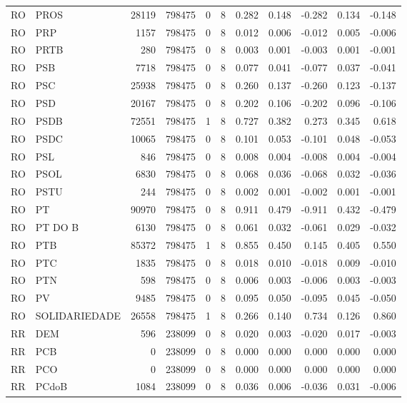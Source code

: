 \begin{landscape}
\begin{longtable}{llrrrrrrrrr}
RO & PROS & 28119 & 798475 & 0 & 8 & 0.282 & 0.148 & -0.282 & 0.134 & -0.148 \\
RO & PRP & 1157 & 798475 & 0 & 8 & 0.012 & 0.006 & -0.012 & 0.005 & -0.006 \\
RO & PRTB & 280 & 798475 & 0 & 8 & 0.003 & 0.001 & -0.003 & 0.001 & -0.001 \\
RO & PSB & 7718 & 798475 & 0 & 8 & 0.077 & 0.041 & -0.077 & 0.037 & -0.041 \\
RO & PSC & 25938 & 798475 & 0 & 8 & 0.260 & 0.137 & -0.260 & 0.123 & -0.137 \\
RO & PSD & 20167 & 798475 & 0 & 8 & 0.202 & 0.106 & -0.202 & 0.096 & -0.106 \\
RO & PSDB & 72551 & 798475 & 1 & 8 & 0.727 & 0.382 & 0.273 & 0.345 & 0.618 \\
RO & PSDC & 10065 & 798475 & 0 & 8 & 0.101 & 0.053 & -0.101 & 0.048 & -0.053 \\
RO & PSL & 846 & 798475 & 0 & 8 & 0.008 & 0.004 & -0.008 & 0.004 & -0.004 \\
RO & PSOL & 6830 & 798475 & 0 & 8 & 0.068 & 0.036 & -0.068 & 0.032 & -0.036 \\
RO & PSTU & 244 & 798475 & 0 & 8 & 0.002 & 0.001 & -0.002 & 0.001 & -0.001 \\
RO & PT & 90970 & 798475 & 0 & 8 & 0.911 & 0.479 & -0.911 & 0.432 & -0.479 \\
RO & PT DO B & 6130 & 798475 & 0 & 8 & 0.061 & 0.032 & -0.061 & 0.029 & -0.032 \\
RO & PTB & 85372 & 798475 & 1 & 8 & 0.855 & 0.450 & 0.145 & 0.405 & 0.550 \\
RO & PTC & 1835 & 798475 & 0 & 8 & 0.018 & 0.010 & -0.018 & 0.009 & -0.010 \\
RO & PTN & 598 & 798475 & 0 & 8 & 0.006 & 0.003 & -0.006 & 0.003 & -0.003 \\
RO & PV & 9485 & 798475 & 0 & 8 & 0.095 & 0.050 & -0.095 & 0.045 & -0.050 \\
RO & SOLIDARIEDADE & 26558 & 798475 & 1 & 8 & 0.266 & 0.140 & 0.734 & 0.126 & 0.860 \\
RR & DEM & 596 & 238099 & 0 & 8 & 0.020 & 0.003 & -0.020 & 0.017 & -0.003 \\
RR & PCB & 0 & 238099 & 0 & 8 & 0.000 & 0.000 & 0.000 & 0.000 & 0.000 \\
RR & PCO & 0 & 238099 & 0 & 8 & 0.000 & 0.000 & 0.000 & 0.000 & 0.000 \\
RR & PCdoB & 1084 & 238099 & 0 & 8 & 0.036 & 0.006 & -0.036 & 0.031 & -0.006 \\

\end{longtable}
\end{landscape}
